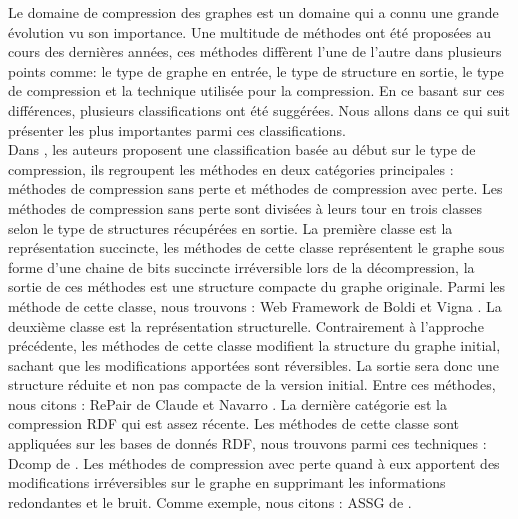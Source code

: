 Le domaine de compression des graphes est un domaine qui a connu une grande évolution vu son importance. Une multitude de méthodes ont été proposées au cours des dernières années, ces méthodes diffèrent l'une de l'autre dans plusieurs points comme: le type de graphe en entrée, le type de structure en sortie, le type de compression et la technique utilisée pour la compression. En ce basant sur ces différences, plusieurs classifications ont été suggérées. Nous allons dans ce qui suit présenter les plus importantes parmi ces classifications.\\

Dans \citep{maneth2015survey}, les auteurs proposent une classification basée au début sur le type de compression, ils regroupent les méthodes en deux catégories principales : méthodes de compression sans perte et méthodes de compression avec perte. Les méthodes de compression sans perte sont divisées à leurs tour en trois classes selon le type de structures récupérées en sortie. La première classe est la représentation succincte, les méthodes de cette classe représentent le graphe sous forme d'une chaine de bits succincte irréversible lors de la décompression, la sortie de ces méthodes est une structure compacte du graphe originale. Parmi les méthode de cette classe, nous trouvons : Web Framework de Boldi et Vigna \citep{boldi2004webgraph}. La deuxième classe est la représentation structurelle. Contrairement à l'approche précédente, les méthodes de cette classe modifient la structure du graphe initial, sachant que les modifications apportées sont réversibles. La sortie sera donc une structure réduite et non pas compacte de la version initial. Entre ces méthodes, nous citons : RePair de Claude et Navarro \citep{claude2010fas}. La dernière catégorie est la compression RDF qui est assez récente. Les méthodes de cette classe sont appliquées sur les bases de donnés RDF, nous trouvons parmi ces techniques : Dcomp de \citep{martinez2012compression} . Les méthodes de compression avec perte quand à eux apportent des modifications irréversibles sur le graphe en supprimant les informations redondantes et le bruit. Comme exemple, nous citons : ASSG de \citep{zhang2014assg}.\\

